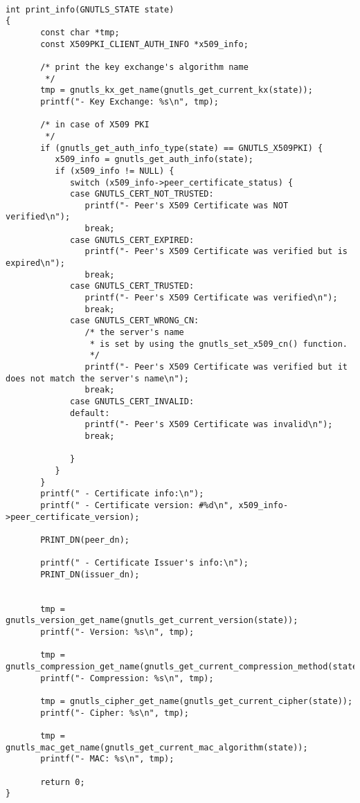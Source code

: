 \begin {verbatim}

int print_info(GNUTLS_STATE state)
{
       const char *tmp;
       const X509PKI_CLIENT_AUTH_INFO *x509_info;

       /* print the key exchange's algorithm name
        */
       tmp = gnutls_kx_get_name(gnutls_get_current_kx(state));
       printf("- Key Exchange: %

       /* in case of X509 PKI
        */
       if (gnutls_get_auth_info_type(state) == GNUTLS_X509PKI) {
	      x509_info = gnutls_get_auth_info(state);
	      if (x509_info != NULL) {
		     switch (x509_info->peer_certificate_status) {
		     case GNUTLS_CERT_NOT_TRUSTED:
			    printf("- Peer's X509 Certificate was NOT verified\n");
			    break;
		     case GNUTLS_CERT_EXPIRED:
			    printf("- Peer's X509 Certificate was verified but is expired\n");
			    break;
		     case GNUTLS_CERT_TRUSTED:
			    printf("- Peer's X509 Certificate was verified\n");
			    break;
		     case GNUTLS_CERT_WRONG_CN:
			    /* the server's name
			     * is set by using the gnutls_set_x509_cn() function.
			     */
			    printf("- Peer's X509 Certificate was verified but it does not match the server's name\n");
			    break;
		     case GNUTLS_CERT_INVALID:
		     default:
			    printf("- Peer's X509 Certificate was invalid\n");
			    break;

		     }
	      }
       }
       printf(" - Certificate info:\n");
       printf(" - Certificate version: #%

       PRINT_DN(peer_dn);

       printf(" - Certificate Issuer's info:\n");
       PRINT_DN(issuer_dn);


       tmp = gnutls_version_get_name(gnutls_get_current_version(state));
       printf("- Version: %

       tmp = gnutls_compression_get_name(gnutls_get_current_compression_method(state));
       printf("- Compression: %

       tmp = gnutls_cipher_get_name(gnutls_get_current_cipher(state));
       printf("- Cipher: %

       tmp = gnutls_mac_get_name(gnutls_get_current_mac_algorithm(state));
       printf("- MAC: %

       return 0;
}

\end{verbatim}
